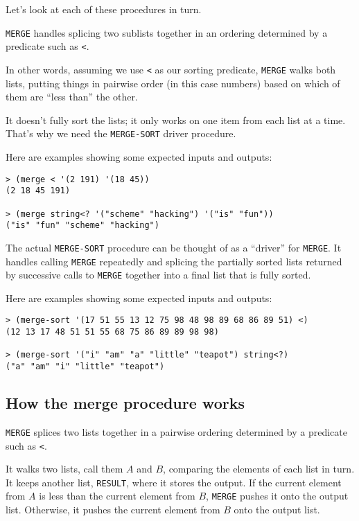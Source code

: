 \documentclass[12pt,openright,draft]{book}
\begin{document}
Let's look at each of these procedures in turn.

\verb|MERGE| handles splicing two sublists together in an ordering
determined by a predicate such as \verb|<|.

In other words, assuming we use \verb|<| as our sorting predicate,
\verb|MERGE| walks both lists, putting things in pairwise order (in
this case numbers) based on which of them are ``less than'' the other.

It doesn't fully sort the lists; it only works on one item from each
list at a time.  That's why we need the \verb|MERGE-SORT| driver
procedure.

Here are examples showing some expected inputs and outputs:

\begin{verbatim}
> (merge < '(2 191) '(18 45))
(2 18 45 191)

> (merge string<? '("scheme" "hacking") '("is" "fun"))
("is" "fun" "scheme" "hacking")
\end{verbatim}

The actual \verb|MERGE-SORT| procedure can be thought of as a
``driver'' for \verb|MERGE|.  It handles calling \verb|MERGE|
repeatedly and splicing the partially sorted lists returned by
successive calls to \verb|MERGE| together into a final list that is
fully sorted.

Here are examples showing some expected inputs and outputs:

\begin{verbatim}
> (merge-sort '(17 51 55 13 12 75 98 48 98 89 68 86 89 51) <)
(12 13 17 48 51 51 55 68 75 86 89 89 98 98)

> (merge-sort '("i" "am" "a" "little" "teapot") string<?)
("a" "am" "i" "little" "teapot")
\end{verbatim}

\subsection{How the merge procedure works}

\verb|MERGE| splices two lists together in a pairwise ordering
determined by a predicate such as \verb|<|.

It walks two lists, call them $A$ and $B$, comparing the elements of
each list in turn.  It keeps another list, \verb|RESULT|, where it stores
the output.  If the current element from $A$ is less than the current
element from $B$, \verb|MERGE| pushes it onto the output list.  Otherwise,
it pushes the current element from $B$ onto the output list.
\end{document}
